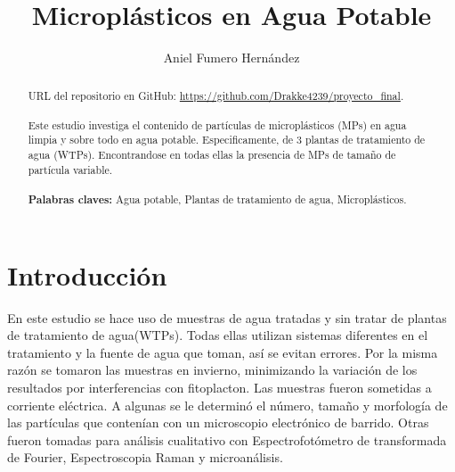 \documentclass[a4paper,11pt]{article}
\title{Microplásticos en Agua Potable}
\author{Aniel Fumero Hernández}
\begin{document}
\maketitle
	\begin{abstract}
	
	URL del repositorio en GitHub:  \href{https://github.com/Drakke4239/proyecto\_final}{https://github.com/Drakke4239/proyecto\_final}.\\
	\\Este estudio investiga el contenido de partículas de microplásticos (MPs) en agua limpia y sobre todo en agua potable. Especificamente, de 3 plantas de tratamiento de agua (WTPs). Encontrandose en todas ellas la presencia de MPs de tamaño de partícula variable.\\\\
	\textbf{Palabras claves:} Agua potable, Plantas de tratamiento de agua, Microplásticos.
	
	\end{abstract}
\tableofcontents
\section{Introducción}
En este estudio se hace uso de muestras de agua tratadas y sin tratar de plantas de tratamiento de agua(WTPs). Todas ellas utilizan sistemas diferentes en el tratamiento y la fuente de agua que toman, así se evitan errores. Por la misma razón se tomaron las muestras en invierno, minimizando la variación de los resultados por interferencias con fitoplacton.
Las muestras fueron sometidas a corriente eléctrica. A algunas se le determinó el número, tamaño y morfología de las partículas que contenían con un microscopio electrónico de barrido. Otras fueron tomadas para análisis cualitativo con Espectrofotómetro de transformada de Fourier, Espectroscopia Raman y microanálisis.
\end{document}
